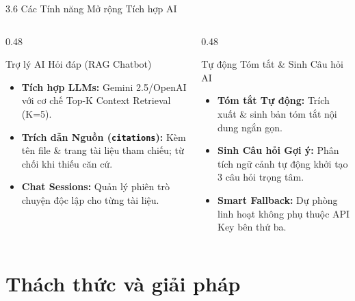 \documentclass[10pt, aspectratio=169]{beamer}
\begin{document}
\begin{frame}{3.6 Các Tính năng Mở rộng Tích hợp AI}
    \begin{columns}[T]
        \begin{column}{0.48\textwidth}
            \begin{block}{Trợ lý AI Hỏi đáp (RAG Chatbot)}
                \begin{itemize}
                    \item \textbf{Tích hợp LLMs:} Gemini 2.5/OpenAI với cơ chế Top-K Context Retrieval (K=5).
                    \item \textbf{Trích dẫn Nguồn (\texttt{citations}):} Kèm tên file \& trang tài liệu tham chiếu; từ chối khi thiếu căn cứ.
                    \item \textbf{Chat Sessions:} Quản lý phiên trò chuyện độc lập cho từng tài liệu.
                \end{itemize}
            \end{block}
        \end{column}

        \begin{column}{0.48\textwidth}
            \begin{alertblock}{Tự động Tóm tắt \& Sinh Câu hỏi AI}
                \begin{itemize}
                    \item \textbf{Tóm tắt Tự động:} Trích xuất \& sinh bản tóm tắt nội dung ngắn gọn.
                    \item \textbf{Sinh Câu hỏi Gợi ý:} Phân tích ngữ cảnh tự động khởi tạo 3 câu hỏi trọng tâm.
                    \item \textbf{Smart Fallback:} Dự phòng linh hoạt không phụ thuộc API Key bên thứ ba.
                \end{itemize}
            \end{alertblock}
        \end{column}
    \end{columns}
\end{frame}

\section{Thách thức và giải pháp}
\end{document}
